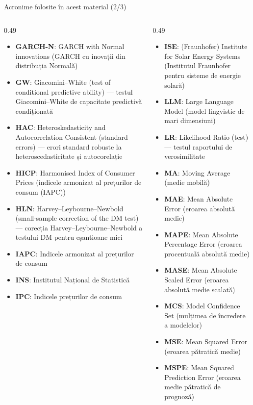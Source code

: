 \begin{frame}{Acronime folosite în acest material (2/3)}
\begin{columns}[T]
\begin{column}{0.49\textwidth}
\begin{itemize}\setlength{\itemsep}{0pt}
    \item \textbf{GARCH-N}: GARCH with Normal innovations (GARCH cu inovații din distribuția Normală)
    \item \textbf{GW}: Giacomini–White (test of conditional predictive ability) — testul Giacomini–White de capacitate predictivă condiționată
    \item \textbf{HAC}: Heteroskedasticity and Autocorrelation Consistent (standard errors) — erori standard robuste la heteroscedasticitate și autocorelație
    \item \textbf{HICP}: Harmonised Index of Consumer Prices (indicele armonizat al prețurilor de consum (IAPC))
    \item \textbf{HLN}: Harvey–Leybourne–Newbold (small-sample correction of the DM test) — corecția Harvey–Leybourne–Newbold a testului DM pentru eșantioane mici
    \item \textbf{IAPC}: Indicele armonizat al prețurilor de consum
    \item \textbf{INS}: Institutul Național de Statistică
    \item \textbf{IPC}: Indicele prețurilor de consum
\end{itemize}
\end{column}
\begin{column}{0.49\textwidth}
\begin{itemize}\setlength{\itemsep}{0pt}
    \item \textbf{ISE}: (Fraunhofer) Institute for Solar Energy Systems (Institutul Fraunhofer pentru sisteme de energie solară)
    \item \textbf{LLM}: Large Language Model (model lingvistic de mari dimensiuni)
    \item \textbf{LR}: Likelihood Ratio (test) — testul raportului de verosimilitate
    \item \textbf{MA}: Moving Average (medie mobilă)
    \item \textbf{MAE}: Mean Absolute Error (eroarea absolută medie)
    \item \textbf{MAPE}: Mean Absolute Percentage Error (eroarea procentuală absolută medie)
    \item \textbf{MASE}: Mean Absolute Scaled Error (eroarea absolută medie scalată)
    \item \textbf{MCS}: Model Confidence Set (mulțimea de încredere a modelelor)
    \item \textbf{MSE}: Mean Squared Error (eroarea pătratică medie)
    \item \textbf{MSPE}: Mean Squared Prediction Error (eroarea medie pătratică de prognoză)
\end{itemize}
\end{column}
\end{columns}
\end{frame}
